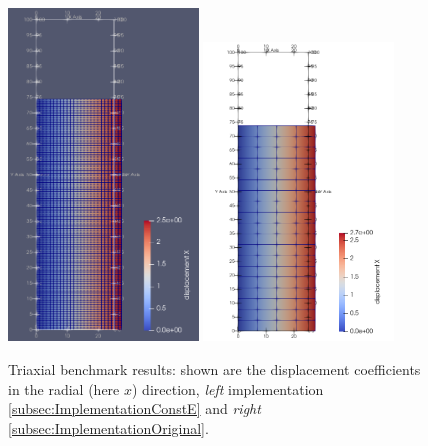\documentclass[paper=a4, twoside, pagesize]{scrartcl}
\begin{document}
\begin{figure}[h!]\centering
  \includegraphics[width=0.45\textwidth]{img/SemiExplicitModifiedCamClay_OpenGeoSys2023/TriaxCamClay_StressControl_ux.png}\vspace{10mm}
  \includegraphics[width=0.45\textwidth]{img/SemiExplicitModifiedCamClay_OpenGeoSys2023/TriaxCamClay_StressControl_ux_Original.png}
  \vspace{-3mm}
  \caption{Triaxial benchmark results: shown are the displacement coefficients in the radial (here $x$) direction, \textsl{left} implementation \ref{subsec:ImplementationConstE} and \textsl{right} \ref{subsec:ImplementationOriginal}.
  }\label{fig:triaxDisplacement}
\end{figure}
\end{document}

